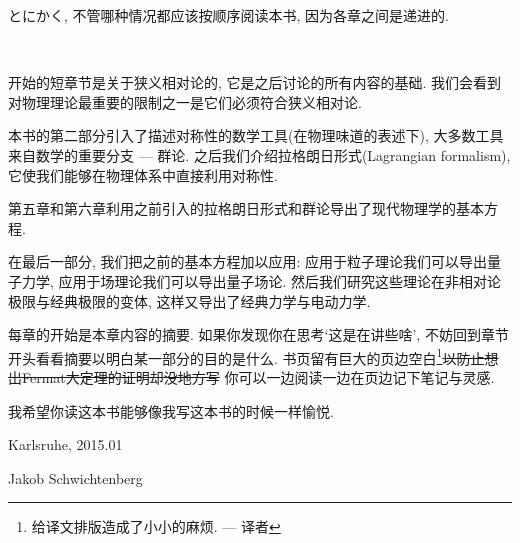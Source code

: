 とにかく, 不管哪种情况都应该按顺序阅读本书, 因为各章之间是递进的.

\ 

开始的短章节是关于狭义相对论的, 它是之后讨论的所有内容的基础. 我们会看到对物理理论最重要的限制之一是它们必须符合狭义相对论. 

本书的第二部分引入了描述对称性的数学工具(在物理味道的表述下), 大多数工具来自数学的重要分支 --- 群论. 之后我们介绍拉格朗日形式(Lagrangian formalism), 它使我们能够在物理体系中直接利用对称性. 

第五章和第六章利用之前引入的拉格朗日形式和群论导出了现代物理学的基本方程. 

在最后一部分, 我们把之前的基本方程加以应用: %
应用于粒子理论我们可以导出量子力学, 应用于场理论我们可以导出量子场论. 然后我们研究这些理论在非相对论极限与经典极限的变体, 这样又导出了经典力学与电动力学.

每章的开始是本章内容的摘要. 如果你发现你在思考`这是在讲些啥', 不妨回到章节开头看看摘要以明白某一部分的目的是什么. 书页留有巨大的页边空白\footnote{给译文排版造成了小小的麻烦. --- 译者}\sout{以防止想出Fermat大定理的证明却没地方写}
你可以一边阅读一边在页边记下笔记与灵感.

我希望你读这本书能够像我写这本书的时候一样愉悦.

\begin{flushright}
Karlsruhe, 2015.01

Jakob Schwichtenberg
\end{flushright}







